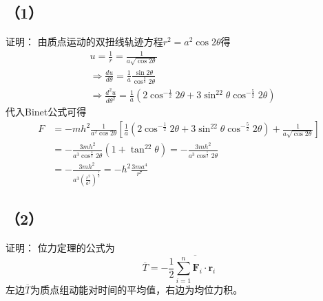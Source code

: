 \documentclass[10pt,a4paper]{article}
\theoremstyle{remark}
\begin{document}
\subsection*{（1）}证明：
由质点运动的双扭线轨迹方程$r^2 = a^2\cos2\theta$得
\begin{align*}
&u = \frac{1}{r} = \frac{1}{a\sqrt{\cos2\theta}}\\
&\Longrightarrow\frac{du}{d\theta} = \frac{1}{a}\frac{\sin2\theta}{\cos^{\frac{3}{2}}2\theta}\\
&\Longrightarrow\frac{d^2u}{{d\theta}^2} = \frac{1}{a}(2\cos^{-\frac{1}{2}}2\theta + 3\sin^22\theta\cos^{-\frac{5}{2}}2\theta)
\end{align*}
代入Binet公式可得
\begin{align*}
F &= -mh^2\frac{1}{a^2\cos2\theta}[\frac{1}{a}(2\cos^{-\frac{1}{2}}2\theta + 3\sin^22\theta\cos^{-\frac{5}{2}}2\theta) + \frac{1}{a\sqrt{\cos2\theta}}]\\
&= -\frac{3mh^2}{a^3\cos^{\frac{3}{2}}2\theta}(1 + \tan^22\theta) = -\frac{3mh^2}{a^3\cos^{\frac{7}{2}}2\theta}\\
&= -\frac{3mh^2}{a^3(\frac{r^2}{a^2})^{\frac{7}{2}}} = -h^2\frac{3ma^4}{r^7}
\end{align*}
\subsection*{（2）}证明：
位力定理的公式为
\[
\overline{T} = -\frac{1}{2}\overline{\sum_{i = 1}^{n}\textbf{F}_i\cdot\textbf{r}_i}
\]
左边$\overline{T}$为质点组动能对时间的平均值，右边为均位力积。
\end{document}
